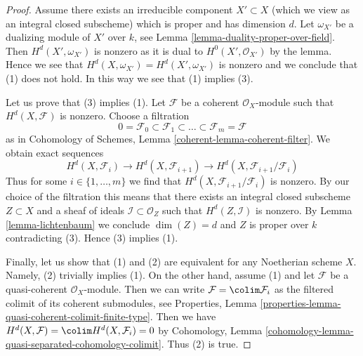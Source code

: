 \begin{proof}
Assume there exists an irreducible component $X' \subset X$ (which we view
as an integral closed subscheme) which is proper and has dimension $d$.
Let $\omega_{X'}$ be a dualizing module of $X'$ over $k$, see
Lemma \ref{lemma-duality-proper-over-field}. Then
$H^d(X', \omega_{X'})$ is nonzero as it is dual to $H^0(X', \mathcal{O}_{X'})$
by the lemma. Hence we see that $H^d(X, \omega_{X'}) = H^d(X', \omega_{X'})$
is nonzero and we conclude that (1) does not hold.
In this way we see that (1) implies (3).

\medskip\noindent
Let us prove that (3) implies (1).
Let $\mathcal{F}$ be a coherent $\mathcal{O}_X$-module such that
$H^d(X, \mathcal{F})$ is nonzero. Choose a filtration
$$
0 = \mathcal{F}_0 \subset \mathcal{F}_1 \subset
\ldots \subset \mathcal{F}_m = \mathcal{F}
$$
as in Cohomology of Schemes, Lemma \ref{coherent-lemma-coherent-filter}.
We obtain exact sequences
$$
H^d(X, \mathcal{F}_i) \to H^d(X, \mathcal{F}_{i + 1}) \to
H^d(X, \mathcal{F}_{i + 1}/\mathcal{F}_i)
$$
Thus for some $i \in \{1, \ldots, m\}$ we find that
$H^d(X, \mathcal{F}_{i + 1}/\mathcal{F}_i)$ is nonzero.
By our choice of the filtration this means that there exists
an integral closed subscheme $Z \subset X$
and a sheaf of ideals $\mathcal{I} \subset \mathcal{O}_Z$
such that $H^d(Z, \mathcal{I})$ is nonzero.
By Lemma \ref{lemma-lichtenbaum}
we conclude $\dim(Z) = d$ and $Z$ is proper over $k$
contradicting (3). Hence (3) implies (1).

\medskip\noindent
Finally, let us show that (1) and (2) are equivalent for any Noetherian scheme
$X$. Namely, (2) trivially implies (1). On the other hand, assume (1) and
let $\mathcal{F}$ be a quasi-coherent $\mathcal{O}_X$-module. Then we can write
$\mathcal{F} = \colim \mathcal{F}_i$ as the filtered colimit of its coherent
submodules, see
Properties, Lemma \ref{properties-lemma-quasi-coherent-colimit-finite-type}.
Then we have $H^d(X, \mathcal{F}) = \colim H^d(X, \mathcal{F}_i) = 0$
by Cohomology, Lemma \ref{cohomology-lemma-quasi-separated-cohomology-colimit}.
Thus (2) is true.
\end{proof}












